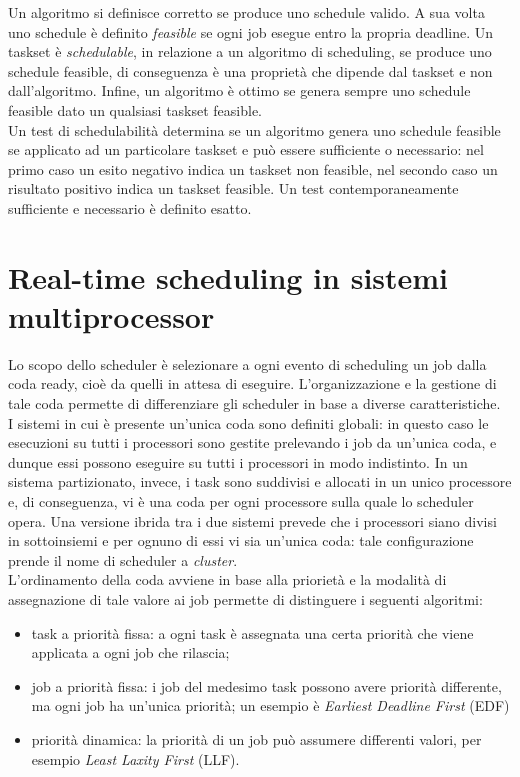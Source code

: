 Un algoritmo si definisce corretto se produce uno schedule valido. A sua volta uno schedule è definito \textit{feasible} se ogni job esegue entro la propria deadline. Un taskset è \textit{schedulable}, in relazione a un algoritmo di scheduling, se produce uno schedule feasible, di conseguenza è una proprietà che dipende dal taskset e non dall'algoritmo. Infine, un algoritmo è ottimo se genera sempre uno schedule feasible dato un qualsiasi taskset feasible.\\

Un test di schedulabilità determina se un algoritmo genera uno schedule feasible se applicato ad un particolare taskset e può essere sufficiente o necessario: nel primo caso un esito negativo indica un taskset non feasible, nel secondo caso un risultato positivo indica un taskset feasible. Un test contemporaneamente sufficiente e necessario è definito esatto.\\

\section{Real-time scheduling in sistemi multiprocessor}
\label{sec:SchedMulti}

Lo scopo dello scheduler è selezionare a ogni evento di scheduling un job dalla coda ready, cioè da quelli in attesa di eseguire. L'organizzazione e la gestione di tale coda permette di differenziare gli scheduler in base a diverse caratteristiche.\\

I sistemi in cui è presente un'unica coda sono definiti globali: in questo caso le esecuzioni su tutti i processori sono gestite prelevando i job da un'unica coda, e dunque essi possono eseguire su tutti i processori in modo indistinto. In un sistema partizionato, invece, i task sono suddivisi e allocati in un unico processore e, di conseguenza, vi è una coda per ogni processore sulla quale lo scheduler opera. Una versione ibrida tra i due sistemi prevede che i processori siano divisi in sottoinsiemi e per ognuno di essi vi sia un'unica coda: tale configurazione prende il nome di scheduler a \textit{cluster}.\\

L'ordinamento della coda avviene in base alla priorietà e la modalità di assegnazione di tale valore ai job permette di distinguere i seguenti algoritmi:

\begin{itemize}
	\item task a priorità fissa: a ogni task è assegnata una certa priorità che viene applicata a ogni job che rilascia;
	\item job a priorità fissa: i job del medesimo task possono avere priorità differente, ma ogni job ha un'unica priorità; un esempio è \textit{Earliest Deadline First} (EDF)
	\item priorità dinamica: la priorità di un job può assumere differenti valori, per esempio \textit{Least Laxity First} (LLF).
\end{itemize}

